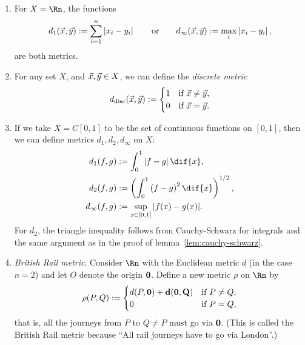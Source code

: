 \begin{examples}
\mbox{}
\begin{enumerate}
	\item For $X=\Rn$, the functions
	\begin{equation*}
		d_1(\vec{x},\vec{y}) := \sum_{i=1}^n \left\vert x_i-y_i \right\vert
		\qquad \text{or} \qquad
		d_\infty(\vec{x},\vec{y}) := \max_i \left\vert x_i-y_i \right\vert,
	\end{equation*}
	are both metrics. %
	
	\item For any set $X$, and $\vec{x},\vec{y} \in X$, we can define the \emph{discrete metric}
	\begin{equation*}
		d_\text{disc}(\xx,\yy) :=
		\begin{cases}
			1 & \text{if } \xx\neq \yy, \\ %
			0 & \text{if } \xx = \yy.
		\end{cases}
	\end{equation*}
	
		\pagebreak

	\item If we take $X=C[0,1]$ to be the set of continuous functions on $[0,1]$, then we can define metrics $d_1,d_2,d_\infty$ on $X$: %
	\begin{align*}
		d_1(f,g) &:= \int_0^1 \left\vert f-g \right\vert\dif{x}, \\
		d_2(f,g) &:= \left( \int_0^1 \left( f-g \right)^2 \dif{x} \right)^{1/2}, \\
		d_\infty(f,g) &:= \sup_{x\in[0,1]} \vert f(x)-g(x) \vert.
	\end{align*}
	For $d_2$, the triangle inequality follows from Cauchy-Schwarz for integrals and the same argument as in the proof of lemma~\ref{lem:cauchy-schwarz}. %
	
	\item \emph{British Rail metric}. Consider $\Rn$ with the Euclidean metric $d$ (in the case $n=2$) and let $O$ denote the origin $\bf{0}$. Define a new metric $\rho$ on $\Rn$ by %
	\begin{equation*}
		\rho(P,Q) :=
		\begin{cases}
			d(P,\bf{0}) + d(\bf{0},Q) & \text{if } P\neq Q, \\ %
			0 & \text{if } P=Q,
		\end{cases}
	\end{equation*}
	that is, all the journeys from $P$ to $Q\neq P$ must go via $\bf{0}$. (This is called the British Rail metric because ``All rail journeys have to go via London''.)
\end{enumerate}
\end{examples}

